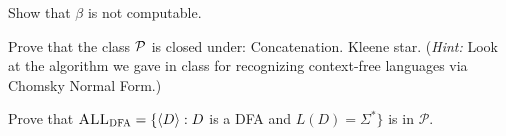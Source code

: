 \documentclass[solution, letterpaper]{cscie121}
\begin{document}
Show that $\beta$ is not computable. 

\begin{solution}
\end{solution}


Prove that the class ${\cal P}$ is closed under:
\subproblem Concatenation.
\subproblem Kleene star. (\emph{Hint:} Look at the algorithm we gave in class for recognizing context-free languages via Chomsky Normal Form.)

\begin{solution}
\end{solution}

Prove that $\textsc{ALL}_\textsc{DFA} = \{\langle D \rangle : D$ is a DFA and $L(D)=\Sigma^*\}$ is in $\mathcal{P}$.

\begin{solution}
\end{solution}
\end{document}
